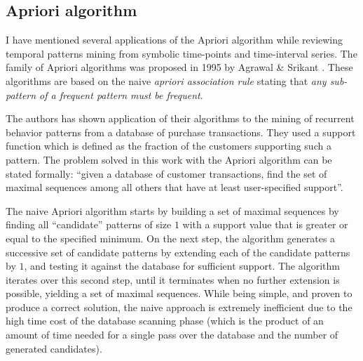 \subsection{Apriori algorithm}\label{apriori}
I have mentioned several applications of the Apriori algorithm while reviewing temporal patterns mining from symbolic time-points and time-interval series. The family of Apriori algorithms was proposed in 1995 by Agrawal \& Srikant \cite{citeulike:775528}. These algorithms are based on the naive \textit{apriori association rule} stating that \textit{any sub-pattern of a frequent pattern must be frequent}. 

The authors has shown application of their algorithms to the mining of recurrent behavior patterns from a database of purchase transactions. They used a support function which is defined as the fraction of the customers supporting such a pattern. The problem solved in this work with the Apriori algorithm can be stated formally: ``given a database of customer transactions, find the set of maximal sequences among all others that have at least user-specified support''.

The naive Apriori algorithm starts by building a set of maximal sequences by finding all ``candidate'' patterns of size $1$ with a support value that is greater or equal to the specified minimum. On the next step, the algorithm generates a successive set of candidate patterns by extending each of the candidate patterns by $1$, and testing it against the database for sufficient support. The algorithm iterates over this second step, until it terminates when no further extension is possible, yielding a set of maximal sequences. While being simple, and proven to produce a correct solution, the naive approach is extremely inefficient due to the high time cost of the database scanning phase (which is the product of an amount of time needed for a single pass over the database and the number of generated candidates).

